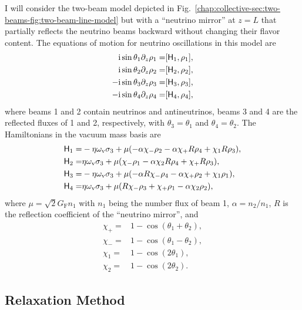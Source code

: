 I will consider the two-beam model depicted in Fig.~\ref{chap:collective-sec:two-beams-fig:two-beam-line-model} but with a ``neutrino mirror'' at $z=L$ that partially reflects the neutrino beams backward without changing their flavor content. The equations of motion for neutrino oscillations in this model are
\begin{align}
    \mathrm{i} \sin\theta_1 \partial_z \rho_1 = & [ \mathsf H_1, \rho_1 ], \\
    \mathrm{i} \sin\theta_2 \partial_z \rho_2 = & [ \mathsf H_2, \rho_2 ], \\
    -\mathrm{i} \sin\theta_3  \partial_z \rho_3 = & [ \mathsf H_3, \rho_3 ], \\
    -\mathrm{i} \sin\theta_4 \partial_z \rho_4 = & [ \mathsf H_4, \rho_4 ],
\end{align}
where beams 1 and 2 contain neutrinos and antineutrinos, beams 3 and 4 are the reflected fluxes of 1 and 2, respectively, with $\theta_3=\theta_1$ and $\theta_4=\theta_2$. The Hamiltonians in the vacuum mass basis are 
\begin{align}
    \mathsf H_1 =& -\eta \omega_\mathrm v \sigma_3 + \mu( -\alpha \chi_-  \rho_2 - \alpha \chi_+ R \rho_4 + \chi_1 R  \rho_3), \\
    \mathsf H_2 =& \eta \omega_\mathrm v \sigma_3 + \mu( \chi_- \rho_1 -\alpha \chi_2 R  \rho_4 + \chi_+ R  \rho_3), \\
    \mathsf H_3 =& -\eta \omega_\mathrm v \sigma_3 + \mu( -\alpha R  \chi_-  \rho_4 -\alpha \chi_+ \rho_2 + \chi_1  \rho_1), \\
    \mathsf H_4 =& \eta \omega_\mathrm v \sigma_3 + \mu( R   \chi_- \rho_3 + \chi_+  \rho_1 -\alpha \chi_2  \rho_2),
\end{align}
where $\mu=\sqrt{2}G_{\mathrm F}n_1$ with $n_1$ being the number flux of beam 1, $\alpha=n_2/n_1$, $R$ is the reflection coefficient of the ``neutrino mirror'', and 
\begin{align*}
    \chi_+ = & 1 - \cos ( \theta_1 + \theta_2 ), \\
    \chi_- = & 1 - \cos ( \theta_1 - \theta_2 ), \\
    \chi_1 = & 1 - \cos ( 2\theta_1 ), \\
    \chi_2 = & 1 - \cos ( 2\theta_2 ).
\end{align*}




\subsection{\label{chap:halo-sec:num}Relaxation Method}



